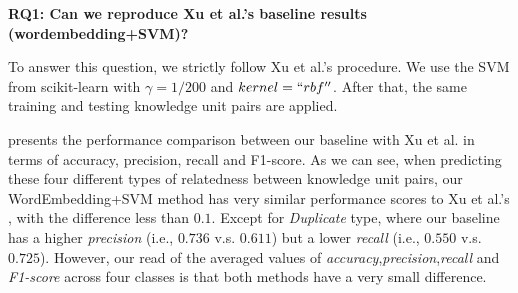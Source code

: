 
\textbf{RQ1: Can we reproduce Xu et al.'s baseline results (wordembedding+SVM)?}



To answer this question, we strictly follow Xu et al.'s procedure\cite{xu2016predicting}. We 
use the SVM from scikit-learn with $\gamma = 1/200$ and $kernel= ``rbf''$. After that,
the same training and testing knowledge unit pairs are applied.

  presents the performance comparison between our baseline with
 Xu et al. in terms of accuracy, precision, recall and F1-score. As we can see, 
 when predicting these four different types of relatedness between knowledge unit pairs,
 our WordEmbedding+SVM method has  very  similar performance scores  to Xu et al.'s
, with the difference less than $0.1$.  Except for {\it Duplicate} type, where our baseline 
has a higher {\it precision} (i.e., $0.736$ v.s. $0.611$) but a lower {\it recall} (i.e., $0.550$ v.s.$0.725$).
However, our read of the averaged values of {\it accuracy},{\it precision},{\it recall}
and {\it F1-score} across four classes is that both methods have
a very small difference.

